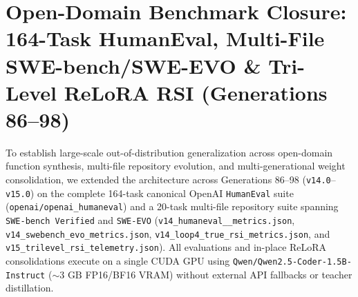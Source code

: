 \documentclass[10pt,twocolumn,letterpaper]{article}
\begin{document}
\section{Open-Domain Benchmark Closure: 164-Task HumanEval, Multi-File SWE-bench/SWE-EVO \& Tri-Level ReLoRA RSI (Generations 86--98)}
\label{sec:v14_closure}

To establish large-scale out-of-distribution generalization across open-domain function synthesis, multi-file repository evolution, and multi-generational weight consolidation, we extended the architecture across Generations 86--98 (\texttt{v14.0}--\texttt{v15.0}) on the complete 164-task canonical OpenAI \texttt{HumanEval} suite (\texttt{openai/\allowbreak openai\_\allowbreak humaneval}) \cite{chen2021} and a 20-task multi-file repository suite spanning \texttt{SWE-bench Verified} \cite{jimenez2024} and \texttt{SWE-EVO} (\texttt{v14\_\allowbreak humaneval\_\_\allowbreak metrics.json}, \texttt{v14\_\allowbreak swebench\_\allowbreak evo\_\allowbreak metrics.json}, \texttt{v14\_\allowbreak loop4\_\allowbreak true\_\allowbreak rsi\_\allowbreak metrics.json}, and \texttt{v15\_\allowbreak trilevel\_\allowbreak rsi\_\allowbreak telemetry.json}). All evaluations and in-place ReLoRA consolidations execute on a single CUDA GPU using \texttt{Qwen/\allowbreak Qwen2.5-Coder-1.5B-Instruct} ($\sim 3\text{ GB}$ FP16/BF16 VRAM) without external API fallbacks or teacher distillation.
\end{document}
